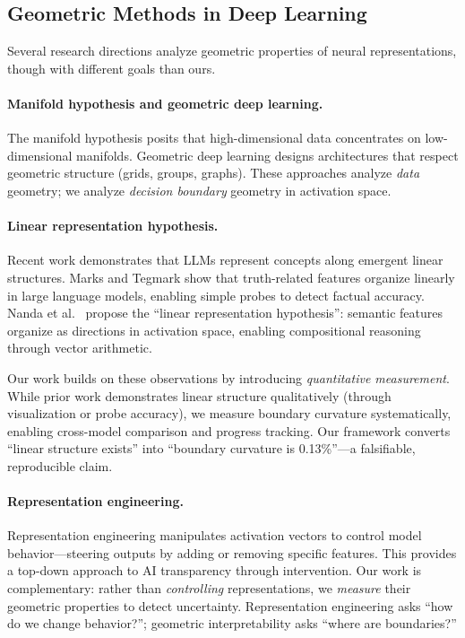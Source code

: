 \documentclass[11pt]{article}
\begin{document}
\subsection{Geometric Methods in Deep Learning}

Several research directions analyze geometric properties of neural representations, though with different goals than ours.

\paragraph{Manifold hypothesis and geometric deep learning.} The manifold hypothesis \citep{bengio2013representation, fefferman2016testing} posits that high-dimensional data concentrates on low-dimensional manifolds. Geometric deep learning \citep{bronstein2021geometric} designs architectures that respect geometric structure (grids, groups, graphs). These approaches analyze \textit{data} geometry; we analyze \textit{decision boundary} geometry in activation space.

\paragraph{Linear representation hypothesis.} Recent work demonstrates that LLMs represent concepts along emergent linear structures. Marks and Tegmark \citep{marks2023geometry} show that truth-related features organize linearly in large language models, enabling simple probes to detect factual accuracy. Nanda et al.\ \citep{nanda2023emergent} propose the ``linear representation hypothesis'': semantic features organize as directions in activation space, enabling compositional reasoning through vector arithmetic.

Our work builds on these observations by introducing \textit{quantitative measurement}. While prior work demonstrates linear structure qualitatively (through visualization or probe accuracy), we measure boundary curvature systematically, enabling cross-model comparison and progress tracking. Our framework converts ``linear structure exists'' into ``boundary curvature is 0.13\%''---a falsifiable, reproducible claim.

\paragraph{Representation engineering.} Representation engineering \citep{zou2023representation} manipulates activation vectors to control model behavior---steering outputs by adding or removing specific features. This provides a top-down approach to AI transparency through intervention. Our work is complementary: rather than \textit{controlling} representations, we \textit{measure} their geometric properties to detect uncertainty. Representation engineering asks ``how do we change behavior?''; geometric interpretability asks ``where are boundaries?''
\end{document}
